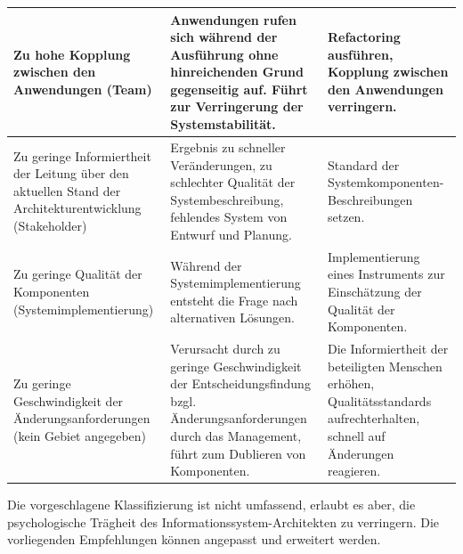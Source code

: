 \documentclass[11pt,a4paper]{article}
\begin{document}
\begin{center}\small
  \begin{tabular}{|p{}|p{}|p{}|}\hline 

    Zu hohe Kopplung zwischen den Anwendungen (Team) &

    Anwendungen rufen sich während der Ausführung ohne hinreichenden Grund
    gegenseitig auf. Führt zur Verringerung der Systemstabilität. &

    Refactoring ausführen, Kopplung zwischen den Anwendungen
    verringern.\\\hline

    Zu geringe Informiertheit der Leitung über den aktuellen Stand der
    Architekturentwicklung (Stakeholder) &

    Ergebnis zu schneller Veränderungen, zu schlechter Qualität der
    Systembeschreibung, fehlendes System von Entwurf und Planung. &

    Standard der Systemkomponenten-Beschreibungen setzen.\\\hline

    Zu geringe Qualität der Komponenten (Systemimplementierung) &

    Während der Systemimplementierung entsteht die Frage nach alternativen
    Lösungen. &

    Implementierung eines Instruments zur Einschätzung der Qualität der
    Komponenten. \\\hline

    Zu geringe Geschwindigkeit der Änderungsanforderungen (kein Gebiet
    angegeben) &
    
    Verursacht durch zu geringe Geschwindigkeit der Entscheidungsfindung
    bzgl. Änderungsanforderungen durch das Management, führt zum Dublieren von
    Komponenten. & 
    
    Die Informiertheit der beteiligten Menschen erhöhen, Qualitätsstandards
    aufrechterhalten, schnell auf Änderungen reagieren.\\\hline
  \end{tabular}
\end{center}

Die vorgeschlagene Klassifizierung ist nicht umfassend, erlaubt es aber, die
psychologische Trägheit des Informationssystem-Architekten zu verringern. Die
vorliegenden Empfehlungen können angepasst und erweitert werden.
\end{document}

